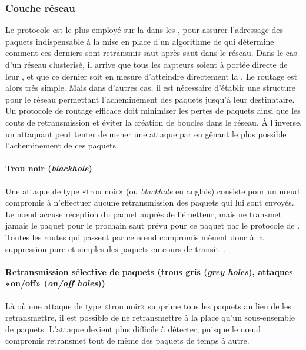     \subsubsection{Couche réseau}
Le protocole \ip est le plus employé sur la  dans les \rcs, pour assurer l'adressage des paquets indispensable à la mise en place d'un algorithme de  qui détermine comment ces derniers sont retransmis saut après saut dans le réseau.
Dans le cas d'un réseau clusterisé, il arrive que tous les capteurs soient à portée directe de leur \ch, et que ce dernier soit en mesure d'atteindre directement la \sdb.
Le routage est alors très simple.
Mais dans d'autres cas, il est nécessaire d'établir une structure pour le réseau permettant l'acheminement des paquets jusqu'à leur destinataire.
Un protocole de routage efficace doit minimiser les pertes de paquets ainsi que les couts de retransmission et éviter la création de boucles dans le réseau.
À l'inverse, un attaquant peut tenter de mener une attaque par \dds en gênant le plus possible l'acheminement de ces paquets.

        \paragraph{Trou noir (\textit{blackhole})}
Une attaque de type «trou noir» (ou \textit{blackhole} en anglais) consiste pour un nœud compromis à n'effectuer aucune retransmission des paquets qui lui sont envoyés.
Le nœud accuse réception du paquet auprès de l'émetteur, mais ne transmet jamais le paquet pour le prochain saut prévu pour ce paquet par le protocole de .
Toutes les routes qui passent par ce nœud compromis mènent donc à la suppression pure et simples des paquets en cours de transit~\cite{Kar05}.

        \paragraph{Retransmission sélective de paquets (trous gris (\textit{grey holes}), attaques «on/off» (\textit{on/off holes}))}
Là où une attaque de type «trou noir»  supprime tous les paquets au lieu de les retransmettre, il est possible de ne retransmettre à la place qu'un sous-ensemble de paquets.
L'attaque devient plus difficile à détecter, puisque le nœud compromis retransmet tout de même des paquets de temps à autre.


